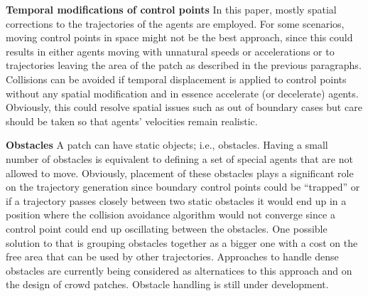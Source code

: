 \textbf{Temporal modifications of control points}
In this paper, mostly spatial corrections to the trajectories of the agents are employed.
For some scenarios, moving control points in space might not be the best approach, since this could results in either agents moving with unnatural speeds or accelerations or to trajectories leaving the area of the patch as described in the previous paragraphs.
Collisions can be avoided if temporal displacement is applied to control points without any spatial modification and in essence accelerate (or decelerate) agents.
Obviously, this could resolve spatial issues such as out of boundary cases but care should be taken so that agents' velocities remain realistic.




\textbf{Obstacles}
A patch can have static objects; i.e., obstacles.
Having a small number of obstacles is equivalent to defining a set of special agents that are not allowed to move.
Obviously, placement of these obstacles plays a significant role on the trajectory generation since boundary control points could be ``trapped'' or if a trajectory passes closely between two static obstacles it would end up in a position where the collision avoidance algorithm would not converge since a control point could end up oscillating between the obstacles.
One possible solution to that is grouping obstacles together as a bigger one with a cost on the free area that can be used by other trajectories.
Approaches to handle dense obstacles are currently being considered as alternatices to this approach and on the design of crowd patches.
Obstacle handling is still under development.


